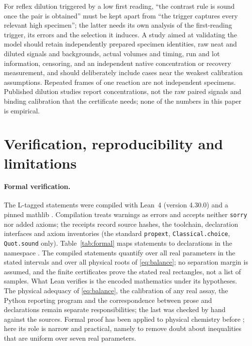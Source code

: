 \documentclass[11pt]{article}
\theoremstyle{plain}
\theoremstyle{definition}
\numberwithin{equation}{section}
\newcommand{\Lean}{\textsf{L}}   %
\begin{document}
For reflex dilution triggered by a low first reading, ``the contrast rule is sound
once the pair is obtained'' must be kept apart from ``the trigger captures every
relevant high specimen''; the latter needs its own analysis of the first-reading
trigger, its errors and the selection it induces. A study aimed at validating the
model should retain independently prepared specimen identities, raw neat and diluted
signals and backgrounds, actual volumes and timing, run and lot information,
censoring, and an independent native concentration or recovery measurement, and
should deliberately include cases near the weakest calibration assumptions. Repeated
frames of one reaction are not independent specimens. Published dilution studies
\cite{hunsaker2024} report concentrations, not the raw paired signals and binding
calibration that the certificate needs; none of the numbers in this paper is
empirical.

\section{Verification, reproducibility and limitations}\label{sec:verification}
\paragraph{Formal verification.} The \Lean-tagged statements were compiled with
Lean~4 (version 4.30.0) and a pinned mathlib \cite{demoura2021,mathlib2020}.
Compilation treats warnings as errors and accepts neither \texttt{sorry} nor added
axioms; the receipts record source hashes, the toolchain, declaration interfaces
and axiom inventories (the standard \texttt{propext}, \texttt{Classical.choice},
\texttt{Quot.sound} only). Table~\ref{tab:formal} maps statements to declarations in
the namespace . The compiled statements quantify over all
real parameters in the stated intervals and over all physical roots of
\eqref{eq:balance}; no separation margin is assumed, and the finite certificates
prove the stated real rectangles, not a list of samples. What Lean verifies is the
encoded mathematics under its hypotheses. The physical adequacy of
\eqref{eq:balance}, the calibration of any real assay, the Python reporting program
and the correspondence between prose and declarations remain separate
responsibilities; the last was checked by hand against the sources. Formal proof
has been applied to physical chemistry before \cite{bobbin2024}; here its role is
narrow and practical, namely to remove doubt about inequalities that are uniform
over seven real parameters.
\end{document}
